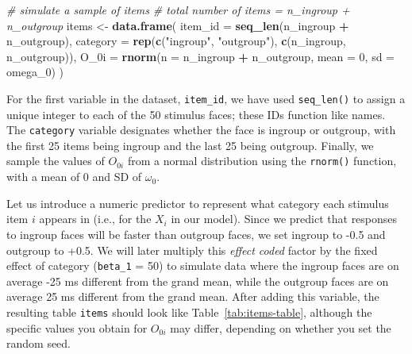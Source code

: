 \documentclass[
  english,
  doc,floatsintext]{apa6}
\newenvironment{Shaded}{\begin{snugshade}}{\end{snugshade}}
\newcommand{\CommentTok}[1]{\textcolor[rgb]{0.56,0.35,0.01}{\textit{#1}}}
\newcommand{\DataTypeTok}[1]{\textcolor[rgb]{0.13,0.29,0.53}{#1}}
\newcommand{\DecValTok}[1]{\textcolor[rgb]{0.00,0.00,0.81}{#1}}
\newcommand{\FloatTok}[1]{\textcolor[rgb]{0.00,0.00,0.81}{#1}}
\newcommand{\KeywordTok}[1]{\textcolor[rgb]{0.13,0.29,0.53}{\textbf{#1}}}
\newcommand{\NormalTok}[1]{#1}
\newcommand{\OperatorTok}[1]{\textcolor[rgb]{0.81,0.36,0.00}{\textbf{#1}}}
\newcommand{\StringTok}[1]{\textcolor[rgb]{0.31,0.60,0.02}{#1}}
\begin{document}
\begin{Shaded}
\begin{Highlighting}[]
\CommentTok{# simulate a sample of items}
\CommentTok{# total number of items = n_ingroup + n_outgroup}
\NormalTok{items <-}\StringTok{ }\KeywordTok{data.frame}\NormalTok{(}
  \DataTypeTok{item_id =} \KeywordTok{seq_len}\NormalTok{(n_ingroup }\OperatorTok{+}\StringTok{ }\NormalTok{n_outgroup),}
  \DataTypeTok{category =} \KeywordTok{rep}\NormalTok{(}\KeywordTok{c}\NormalTok{(}\StringTok{"ingroup"}\NormalTok{, }\StringTok{"outgroup"}\NormalTok{), }\KeywordTok{c}\NormalTok{(n_ingroup, n_outgroup)),}
  \DataTypeTok{O_0i =} \KeywordTok{rnorm}\NormalTok{(}\DataTypeTok{n =}\NormalTok{ n_ingroup }\OperatorTok{+}\StringTok{ }\NormalTok{n_outgroup, }\DataTypeTok{mean =} \DecValTok{0}\NormalTok{, }\DataTypeTok{sd =}\NormalTok{ omega_}\DecValTok{0}\NormalTok{)}
\NormalTok{)}
\end{Highlighting}
\end{Shaded}

\noindent For the first variable in the dataset, \texttt{item\_id}, we have used \texttt{seq\_len()} to assign a unique integer to each of the 50 stimulus faces; these IDs function like names. The \texttt{category} variable designates whether the face is ingroup or outgroup, with the first 25 items being ingroup and the last 25 being outgroup. Finally, we sample the values of \(O_{0i}\) from a normal distribution using the \texttt{rnorm()} function, with a mean of 0 and SD of \(\omega_0\).

Let us introduce a numeric predictor to represent what category each stimulus item \(i\) appears in (i.e., for the \(X_i\) in our model). Since we predict that responses to ingroup faces will be faster than outgroup faces, we set ingroup to -0.5 and outgroup to +0.5. We will later multiply this \emph{effect coded} factor by the fixed effect of category (\texttt{beta\_1} = 50) to simulate data where the ingroup faces are on average -25 ms different from the grand mean, while the outgroup faces are on average 25 ms different from the grand mean. After adding this variable, the resulting table \texttt{items} should look like Table~\ref{tab:items-table}, although the specific values you obtain for \(O_{0i}\) may differ, depending on whether you set the random seed.

\begin{Shaded}
\end{Shaded}
\end{document}
